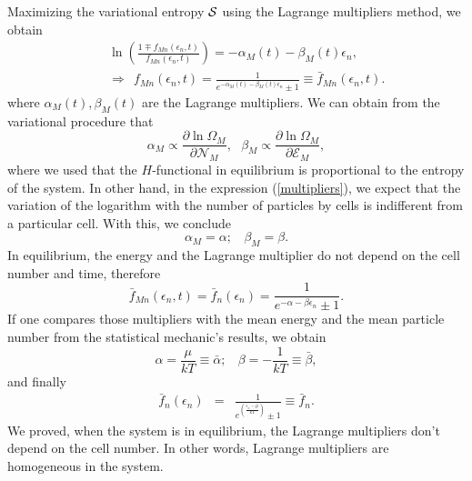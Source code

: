 Maximizing the variational entropy $\mathcal{S}$ using the Lagrange multipliers method,
we obtain
%
\begin{eqnarray}
&&\ln \left(\frac{1\mp f_{Mn}(\epsilon_{n},t)}{f_{Mn}(\epsilon_{n},t)} \right)=-\alpha_M(t)-\beta_M(t) \epsilon_{n}, \label{relation}\\ &&\Rightarrow \ \ f_{Mn}(\epsilon_{n},t)=\frac{1}{e^{-\alpha_M(t)-\beta_M(t) \epsilon_{n}}\pm 1} \equiv \bar{f}_{Mn}(\epsilon_{n},t) \label{distributionequilibrium}.
\end{eqnarray}
%
where $\alpha_M(t), \beta_M(t)$ are the Lagrange multipliers. We can obtain
from the variational procedure that
%
\begin{equation}
    \alpha_M\propto \frac{\partial \ln \Omega_M}{\partial \mathcal{N}_M}, \ \ \ \beta_M\propto \frac{\partial \ln \Omega_M}{\partial \mathcal{E}_M},\label{multipliers}
\end{equation}
%
where we used that the $H$-functional in equilibrium is proportional to the
entropy of the system.
In other hand, in the expression (\ref{multipliers}), we expect that the
variation of the logarithm with the number of particles by cells is indifferent
from a particular cell. With this, we conclude 
%
\begin{equation}
    \alpha_M=\alpha; \ \ \ \ \beta_M=\beta.
\end{equation}
%
In equilibrium, the energy and the Lagrange multiplier do not depend on the
cell number and time, therefore
%
\begin{equation}
    \bar f_{Mn}(\epsilon_{n},t)=\bar f_n(\epsilon_{n}) =\frac{1}{e^{-\alpha-\beta \epsilon_n}\pm 1}.
\end{equation}
%
If one compares those multipliers with the mean energy and the mean particle
number from the statistical mechanic's results, we obtain
%
\begin{equation}
    \alpha=\frac{\mu}{kT}\equiv \bar{\alpha}; \ \ \ \ \beta=-\frac{1}{kT}\equiv \bar{\beta},
\end{equation}
%
and finally
%
\begin{eqnarray}
    \bar{f}_{n}(\epsilon_{n})&=&\frac{1}{e^{(\frac{{\epsilon_n}-\bar{\mu}}{kT})}\pm 1}\equiv \bar{f}_{n}.
\end{eqnarray}
%
We proved, when the system is in equilibrium, the Lagrange multipliers don't
depend on the cell number. In other words, Lagrange multipliers are homogeneous
in the system.

